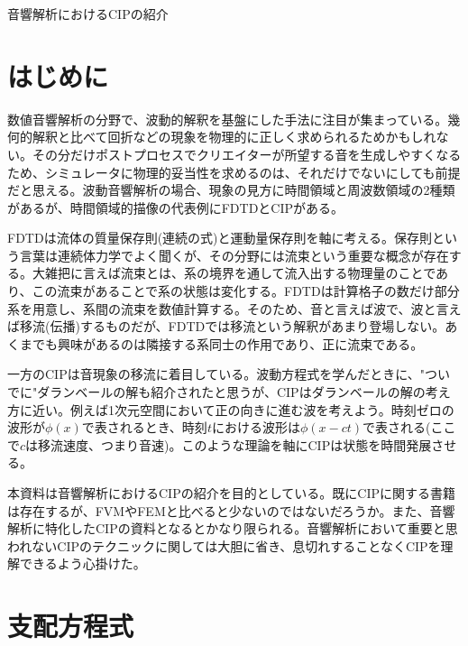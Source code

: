 \documentclass[dvipdfmx, 9pt, a4paper]{jsarticle}
\begin{document}
\begin{center}
{\fontsize{18pt}{1pt}\selectfont 音響解析におけるCIPの紹介}\\
\end{center}
\section*{はじめに}
数値音響解析の分野で、波動的解釈を基盤にした手法に注目が集まっている。幾何的解釈と比べて回折などの現象を物理的に正しく求められるためかもしれない。その分だけポストプロセスでクリエイターが所望する音を生成しやすくなるため、シミュレータに物理的妥当性を求めるのは、それだけでないにしても前提だと思える。波動音響解析の場合、現象の見方に時間領域と周波数領域の2種類があるが、時間領域的描像の代表例にFDTDとCIPがある。\par
FDTDは流体の質量保存則(連続の式)と運動量保存則を軸に考える。保存則という言葉は連続体力学でよく聞くが、その分野には流束という重要な概念が存在する。大雑把に言えば流束とは、系の境界を通して流入出する物理量のことであり、この流束があることで系の状態は変化する。FDTDは計算格子の数だけ部分系を用意し、系間の流束を数値計算する。そのため、音と言えば波で、波と言えば移流(伝播)するものだが、FDTDでは移流という解釈があまり登場しない。あくまでも興味があるのは隣接する系同士の作用であり、正に流束である。\par
一方のCIPは音現象の移流に着目している。波動方程式を学んだときに、"ついでに"ダランベールの解も紹介されたと思うが、CIPはダランベールの解の考え方に近い。例えば1次元空間において正の向きに進む波を考えよう。時刻ゼロの波形が$\phi(x)$で表されるとき、時刻$t$における波形は$\phi(x-ct)$で表される(ここで$c$は移流速度、つまり音速)。このような理論を軸にCIPは状態を時間発展させる。\par
本資料は音響解析におけるCIPの紹介を目的としている。既にCIPに関する書籍は存在するが、FVMやFEMと比べると少ないのではないだろうか。また、音響解析に特化したCIPの資料となるとかなり限られる。音響解析において重要と思われないCIPのテクニックに関しては大胆に省き、息切れすることなくCIPを理解できるよう心掛けた。

\section{支配方程式}
\end{document}

